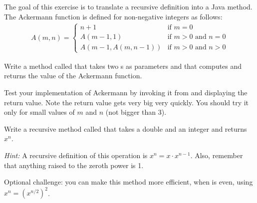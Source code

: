 \begin{exercise}  %

The goal of this exercise is to translate a recursive definition into a Java method.
The Ackermann function is defined for non-negative integers as follows:
\begin{eqnarray*}
A(m, n) = \begin{cases}
              n+1 & \mbox{if } m = 0 \\
        A(m-1, 1) & \mbox{if } m > 0 \mbox{ and } n = 0 \\
A(m-1, A(m, n-1)) & \mbox{if } m > 0 \mbox{ and } n > 0
\end{cases}
\end{eqnarray*}

Write a method called  that takes two s as parameters and that computes and returns the value of the Ackermann function.

Test your implementation of Ackermann by invoking it from  and displaying the return value.
Note the return value gets very big very quickly.
You should try it only for small values of $m$ and $n$ (not bigger than 3).

\end{exercise}


\begin{exercise}  %
\label{ex.power}

Write a recursive method called  that takes a double  and an integer  and returns $x^n$.

{\it Hint:} A recursive definition of this operation is $x^n = x \cdot x^{n-1}$.
Also, remember that anything raised to the zeroth power is 1.

Optional challenge: you can make this method more efficient, when  is even, using $x^n = \left( x^{n/2} \right)^2$.

\end{exercise}
